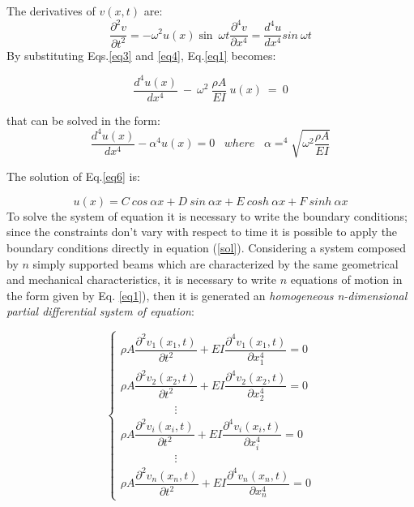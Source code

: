 \documentclass{article}
\begin{document}
{\noindent The derivatives of $v(x,t)$ are:
\begin{subequations}
\begin{equation}
    \dfrac{\partial^2 v}{\partial t^2} = -\omega^2 u(x) \sin \ \omega t  %
    \label{eq3}
\end{equation} 
\begin{equation}
    \dfrac{\partial^4 v}{\partial x^4} = \dfrac{d^4 u}{d x^4} sin \ \omega t
\label{eq4}
\end{equation} 
\end{subequations}
By substituting Eqs.\ref{eq3} and \ref{eq4}, Eq.\ref{eq1} becomes:

\begin{equation}
     \dfrac{d^4 u(x)}{d x^4} \ -  \ \omega^2  \ \dfrac{\rho A}{EI} \ u(x) \ = \ 0
\end{equation}

\noindent that can be solved in the form:
\begin{equation}
\dfrac{d^4 u(x)}{d x^4} - \alpha^4 u(x) = 0 \; \; \; where \; \; \; \alpha = ^4\sqrt{\omega^2 \dfrac{\rho A}{EI}} 
\label{eq6}
\end{equation}

\noindent The solution of Eq.\ref{eq6} is:

\begin{equation}
u(x) = C \ cos\ \alpha x   + D \ sin\ \alpha x   + E \ cosh\ \alpha x   + F \ sinh\ \alpha x  
\label{sol}
\end{equation}
To solve the system of equation it is necessary to write the boundary conditions; since the constraints don't vary with respect to time it is possible to apply the boundary conditions directly in equation (\ref{sol}).\newline
Considering a system composed by $n$ simply supported beams which are characterized by the same geometrical and mechanical characteristics, it is necessary to write $n$ equations of motion in the form given by Eq. \ref{eq1}), then it is generated an \textit{homogeneous n-dimensional partial differential system of equation}:

\begin{equation}
     \begin{cases}
    \rho A \dfrac{\partial^2 v_1(x_1,t)}{\partial t^2} + EI\dfrac{\partial^4 v_1(x_1,t)}{\partial x_1^4}=0\\
    \rho A \dfrac{\partial^2 v_2(x_2,t)}{\partial t^2} + EI\dfrac{\partial^4 v_2(x_2,t)}{\partial x_2^4}=0\\
    \hspace{2cm} \vdots\\
    \rho A \dfrac{\partial^2 v_i(x_i,t)}{\partial t^2} + EI\dfrac{\partial^4 v_i(x_i,t)}{\partial x_i^4}=0\\
    \hspace{2cm} \vdots\\
    \rho A \dfrac{\partial^2 v_n(x_n,t)}{\partial t^2} + EI\dfrac{\partial^4 v_n(x_n,t)}{\partial x_n^4}=0
    \end{cases}
    \label{eq:diff1}
\end{equation}

}
\end{document}

